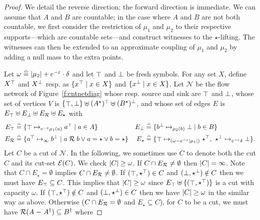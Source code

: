 \documentclass{lmcs}
\begin{document}
\begin{proof}
  We detail the reverse direction; the forward direction is immediate.  We can
  assume that $A$ and
  $B$ are countable; in the case where $A$ and $B$ are not both
  countable, we first consider the restriction of $\mu_1$ and $\mu_2$
  to their respective supports---which are countable sets---and
  construct witnesses to the $\star$-lifting. The witnesses can then
  be extended to an approximate coupling of $\mu_1$ and $\mu_2$ by adding a null
  mass to the extra points.

  Let $\omega \mathrel{\stackrel{\scriptscriptstyle \triangle}{=}} |{\mu_2}| + e^{-\varepsilon}\cdot\delta$ and let
  $\mathop{\top}$ and $\mathop{\perp}$ be fresh symbols. For any set $X$, define
  $X^{\mathop{\top}}$ and $X^{\mathop{\perp}}$ resp. as $\{ x^{\mathop{\top}} \mid x \in X \}$
  and $\{ x^{\mathop{\perp}} \mid x \in X \}$.
  Let $\mathcal{N}$ be the flow network of Figure~\ref{f:cntnetdiag}
  whose resp. source and sink are $\mathop{\top}$ and $\mathop{\perp}$, whose set of
  vertices $V$ is
  $\{ \mathop{\top}, \mathop{\perp} \} \uplus (A^\star)^{\mathop{\top}} \uplus (B^\star)^{\mathop{\perp}}$,
  and whose set of edges $E$ is
  $E_{\mathop{\top}} \uplus E_{\mathop{\perp}} \uplus E_{\mathcal{R}} \uplus E_{\star}$ with
  \begin{align*}
    E_{\mathop{\top}} &\mathrel{\stackrel{\scriptscriptstyle \triangle}{=}} \{ \mathop{\top} \mapsto_{e^{-\varepsilon}\mu_1(a)} a^{\mathop{\top}} \mid a \in A \}&
    E_{\mathop{\perp}} &\mathrel{\stackrel{\scriptscriptstyle \triangle}{=}} \{ b^{\mathop{\perp}} \mapsto_{\mu_2(b)} \mathop{\perp} \mid b \in B \}\\
    E_{\mathcal{R}} &\mathrel{\stackrel{\scriptscriptstyle \triangle}{=}} \{ a^{\mathop{\top}}  \mapsto_{\infty} b^{\mathop{\perp}} \mid a \mathrel{\mathcal{R}} b  \vee a = \star \vee b = \star \}&
    E_{\star} &\mathrel{\stackrel{\scriptscriptstyle \triangle}{=}} \{\mathop{\top} \mapsto_{(\omega - e^{-\varepsilon}|{\mu_1}|)} \star^{\mathop{\top}},~\star^{\mathop{\perp}} \mapsto_{e^{-\varepsilon}\delta} \mathop{\perp} \}.
  \end{align*}
  Let $C$ be a cut of $\mathcal{N}$. In the following, we sometimes use $C$
  to denote both the cut $C$ and its cut-set $\mathcal{E}(C)$. We check
  $|{C}| \geq \omega$.  If $C \cap E_{\mathcal{R}} \neq \emptyset$ then
  $|{C}| = \infty$.
  Note that $C \cap E_{\star} = \emptyset$ implies
  $C \cap E_{\mathcal{R}} \neq \emptyset$.
  If $(\mathop{\top}, \star^{\mathop{\top}}) \in C$ and
  $(\mathop{\perp}, \star^{\mathop{\perp}}) \notin C$ then we must have
  $E_{\mathop{\top}} \subseteq C$.  This implies that $|{C}|\geq \omega$
  since $E_{\mathop{\top}} \uplus \{(\mathop{\top}, \star^{\mathop{\top}})\}$ is a cut with
  capacity $\omega$.  If $(\mathop{\top}, \star^{\mathop{\top}}) \notin C$ and
  $(\mathop{\perp}, \star^{\mathop{\perp}}) \in C$ then we have
  $|{C}|\geq \omega$ in the similar way as above.
  Otherwise (\ie $C \cap E_{\mathcal{R}} = \emptyset$ and
  $E_{\star} \subseteq C$), for $C$ to be a cut, we must have
  $\mathcal{R}(A \mathrel{-} A^{\dagger}) \subseteq B^{\dagger}$ where

\end{proof}
\end{document}

